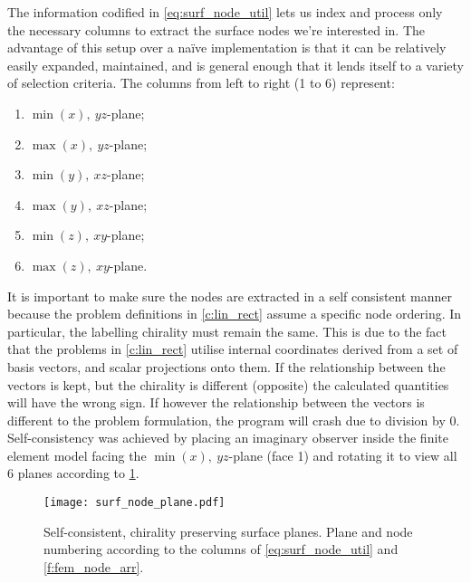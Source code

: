 The information codified in \cref{eq:surf_node_util} lets us index and process only the necessary columns to extract the surface nodes we're interested in. The advantage of this setup over a naïve implementation is that it can be relatively easily expanded, maintained, and is general enough that it lends itself to a variety of selection criteria. The columns from left to right (1 to 6) represent:
\begin{enumerate}
	\item $ \min(x),~ yz $-plane;
	\item $ \max(x),~ yz $-plane;
	\item $ \min(y),~ xz $-plane;
	\item $ \max(y),~ xz $-plane;
	\item $ \min(z),~ xy $-plane;
	\item $ \max(z),~ xy $-plane.
\end{enumerate}

It is important to make sure the nodes are extracted in a self consistent manner because the problem definitions in \cref{c:lin_rect} assume a specific node ordering. In particular, the labelling chirality must remain the same. This is due to the fact that the problems in \cref{c:lin_rect} utilise internal coordinates derived from a set of basis vectors, and scalar projections onto them. If the relationship between the vectors is kept, but the chirality is different (opposite) the calculated quantities will have the wrong sign. If however the relationship between the vectors is different to the problem formulation, the program will crash due to division by 0. Self-consistency was achieved by placing an imaginary observer inside the finite element model facing the $ \min(x),~ yz $-plane (face 1) and rotating it to view all 6 planes according to \cref{f:surf_node_plane}.
\begin{figure}
	\centering
	\texttt{[image: surf\_node\_plane.pdf]}
	\caption[Self-consistent, chirality preserving surface planes.]{Self-consistent, chirality preserving surface planes. Plane and node numbering according to the columns of \cref{eq:surf_node_util} and \cref{f:fem_node_arr}.}
	\label{f:surf_node_plane}
\end{figure}
